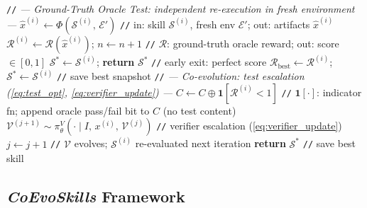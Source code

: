 \documentclass{article}
\newcommand{\method}{\textit{CoEvoSkills}\xspace}
\newcommand{\skill}{\mathcal{S}}
\begin{document}
\begin{algorithm}[t]
\begin{algorithmic}[1]
    \ENDIF
    \STATE \texttt{//} \textit{--- Ground-Truth Oracle Test: independent re-execution in fresh environment ---}
    \STATE $\hat{x}^{(i)} \leftarrow \Phi(\skill^{(i)},\, \mathcal{E}')$ \hfill \texttt{//} in: skill $\skill^{(i)}$, fresh env $\mathcal{E}'$; out: artifacts $\hat{x}^{(i)}$
    \STATE $\mathcal{R}^{(i)} \leftarrow \mathcal{R}(\hat{x}^{(i)})$;\; $n \leftarrow n{+}1$ \hfill \texttt{//} $\mathcal{R}$: ground-truth oracle reward; out: score $\in [0,1]$
        \STATE $\skill^* \leftarrow \skill^{(i)}$;\; \textbf{return} $\skill^*$ \hfill \texttt{//} early exit: perfect score
        \STATE $\mathcal{R}_{\mathrm{best}} \leftarrow \mathcal{R}^{(i)}$;\; $\skill^* \leftarrow \skill^{(i)}$ \hfill \texttt{//} save best snapshot
    \ENDIF
    \STATE \texttt{//} \textit{--- Co-evolution: test escalation (\autoref{eq:test_opt}, \autoref{eq:verifier_update}) ---}
    \STATE $C \leftarrow C \oplus \mathbf{1}[\mathcal{R}^{(i)} {<} 1]$ \hfill \texttt{//} $\mathbf{1}[\cdot]$: indicator fn; append oracle pass/fail bit to $C$ (no test content)
    \STATE $\mathcal{V}^{(j+1)} \sim \pi_\theta^{V}\!\left(\cdot \mid I,\, x^{(i)},\, \mathcal{V}^{(j)}\right)$ \hfill \texttt{//} verifier escalation (\autoref{eq:verifier_update})
    \STATE $j \leftarrow j{+}1$ \hfill \texttt{//} $\mathcal{V}$ evolves; $\skill^{(i)}$ re-evaluated next iteration
\ENDWHILE
\STATE \textbf{return} $\skill^*$ \hfill \texttt{//} save best skill
\end{algorithmic}
\end{algorithm}


\subsection{\method Framework}
\label{sec:evoskill}
\end{document}
